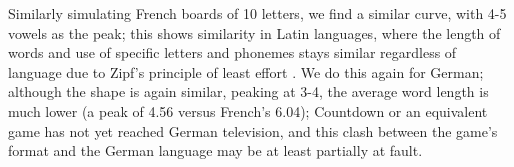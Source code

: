 \documentclass{article}
\begin{document}
Similarly simulating French boards of 10 letters, we find a similar curve, with 4-5 vowels as the peak; this shows similarity in Latin languages, where the length of words and use of specific letters and phonemes stays similar regardless of language due to Zipf's principle of least effort \citep{ZipfHuman}. We do this again for German; although the shape is again similar, peaking at 3-4, the average word length is much lower (a peak of 4.56 versus French's 6.04); Countdown or an equivalent game has not yet reached German television, and this clash between the game's format and the German language may be at least partially at fault. 

{}

\end{document}
